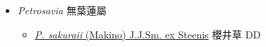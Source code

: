 
  \begin{itemize}
 \item[] \textit{Petrosavia} 無葉蓮屬
                                
  \begin{itemize}
        \item[] \href{http://www.theplantlist.org/tpl1.1/search?q=Petrosavia+sakuraii}{\textit{P. sakuraii} (Makino) J.J.Sm. ex Steenis}   櫻井草   DD
  \end{itemize}
  \end{itemize}
